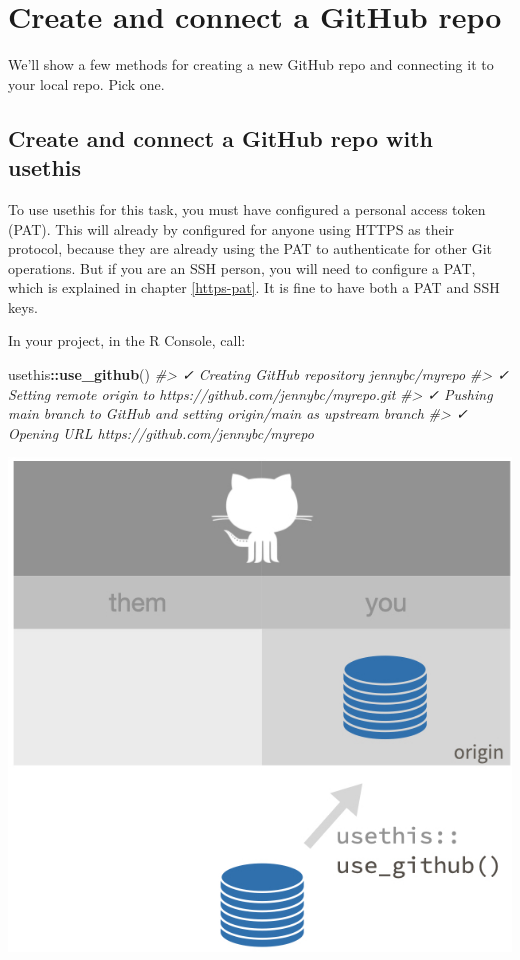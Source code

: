 \documentclass[
]{book}
\newenvironment{Shaded}{\begin{snugshade}}{\end{snugshade}}
\newcommand{\CommentTok}[1]{\textcolor[rgb]{0.56,0.35,0.01}{\textit{#1}}}
\newcommand{\FunctionTok}[1]{\textcolor[rgb]{0.13,0.29,0.53}{\textbf{#1}}}
\newcommand{\NormalTok}[1]{#1}
\newcommand{\SpecialCharTok}[1]{\textcolor[rgb]{0.81,0.36,0.00}{\textbf{#1}}}
\begin{document}
\section{Create and connect a GitHub repo}\label{create-and-connect-a-github-repo}

We'll show a few methods for creating a new GitHub repo and connecting it to your local repo.
Pick one.

\subsection{Create and connect a GitHub repo with usethis}\label{create-and-connect-a-github-repo-with-usethis}

To use usethis for this task, you must have configured a personal access token (PAT).
This will already by configured for anyone using HTTPS as their protocol, because they are already using the PAT to authenticate for other Git operations.
But if you are an SSH person, you will need to configure a PAT, which is explained in chapter \ref{https-pat}.
It is fine to have both a PAT and SSH keys.

In your project, in the R Console, call:

\begin{Shaded}
\begin{Highlighting}[]
\NormalTok{usethis}\SpecialCharTok{::}\FunctionTok{use\_github}\NormalTok{()}
\CommentTok{\#\textgreater{} ✓ Creating GitHub repository \textquotesingle{}jennybc/myrepo\textquotesingle{}}
\CommentTok{\#\textgreater{} ✓ Setting remote \textquotesingle{}origin\textquotesingle{} to \textquotesingle{}https://github.com/jennybc/myrepo.git\textquotesingle{}}
\CommentTok{\#\textgreater{} ✓ Pushing \textquotesingle{}main\textquotesingle{} branch to GitHub and setting \textquotesingle{}origin/main\textquotesingle{} as upstream branch}
\CommentTok{\#\textgreater{} ✓ Opening URL \textquotesingle{}https://github.com/jennybc/myrepo\textquotesingle{}}
\end{Highlighting}
\end{Shaded}

\begin{center}\includegraphics[width=0.6\linewidth]{img/use_github} \end{center}
\end{document}

